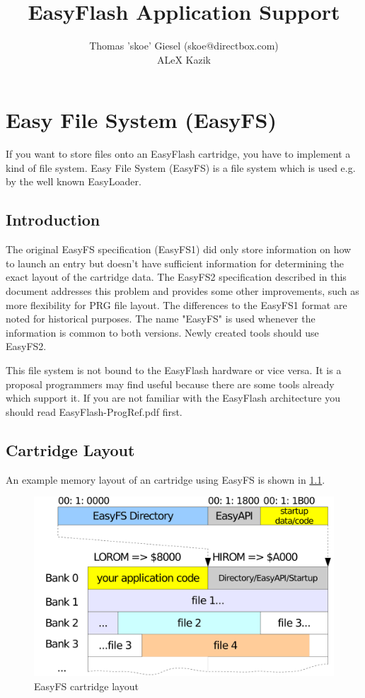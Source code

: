 \documentclass[a4paper,oneside]{memoir}
\title{EasyFlash Application Support}
\author{
Thomas 'skoe' Giesel (skoe@directbox.com) \\
ALeX Kazik
}
\begin{document}
\hsize
\maketitle

\tableofcontents

\chapter{Easy File System (EasyFS)}

If you want to store files onto an EasyFlash cartridge, you have to implement a
kind of file system. Easy File System (EasyFS) is a file system which is used
e.g. by the well known EasyLoader.

\section{Introduction}

The original EasyFS specification (EasyFS1) did only store information on how to
launch an entry but doesn't have sufficient information
for determining the exact layout of the cartridge data.
The EasyFS2 specification described in this document addresses this problem and
provides some other improvements, such as more flexibility for PRG file layout.
The differences to the EasyFS1 format are noted for historical purposes.
The name "EasyFS" is used whenever the information is common to both versions.
Newly created tools should use EasyFS2.

This file system is not bound to the EasyFlash hardware or vice versa. It is a
proposal programmers may find useful because there are some tools already which
support it. If you are not familiar with the EasyFlash architecture you should
read EasyFlash-ProgRef.pdf first.

\section{Cartridge Layout}

An example memory layout of an cartridge using EasyFS is shown in \ref{fig:easyfs}.

\begin{figure}[!htbp]
    \centering
    \includegraphics[scale=0.025]{src/easyfs.pdf}
    \caption{EasyFS cartridge layout}
    \label{fig:easyfs}
\end{figure}
\end{document}
